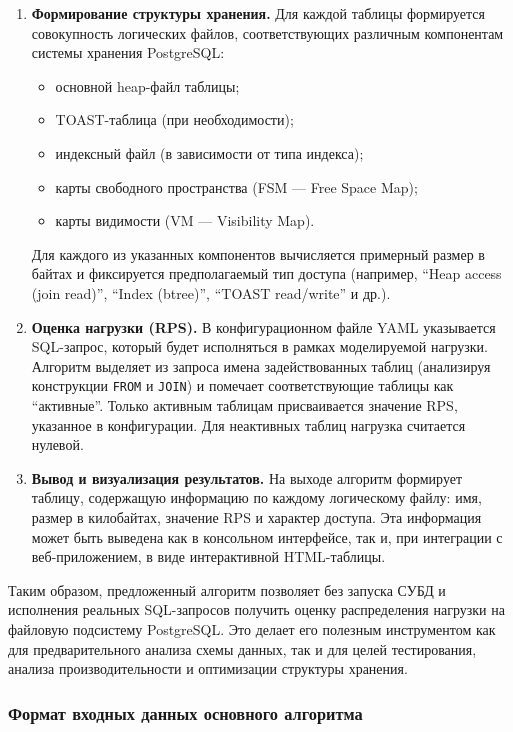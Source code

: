 \begin{enumerate}
    \item \textbf{Формирование структуры хранения.}
    Для каждой таблицы формируется совокупность логических файлов, соответствующих различным компонентам системы хранения PostgreSQL:
    \begin{itemize}
        \item основной heap-файл таблицы;
        \item TOAST-таблица (при необходимости);
        \item индексный файл (в зависимости от типа индекса);
        \item карты свободного пространства (FSM --- Free Space Map);
        \item карты видимости (VM --- Visibility Map).
    \end{itemize}
    Для каждого из указанных компонентов вычисляется примерный размер в байтах и фиксируется предполагаемый тип доступа (например, ``Heap access (join read)'', ``Index (btree)'', ``TOAST read/write'' и др.).

    \item \textbf{Оценка нагрузки (RPS).}
    В конфигурационном файле YAML указывается SQL-запрос, который будет исполняться в рамках моделируемой нагрузки. Алгоритм выделяет из запроса имена задействованных таблиц (анализируя конструкции \texttt{FROM} и \texttt{JOIN}) и помечает соответствующие таблицы как ``активные''. Только активным таблицам присваивается значение RPS, указанное в конфигурации. Для неактивных таблиц нагрузка считается нулевой.

    \item \textbf{Вывод и визуализация результатов.}
    На выходе алгоритм формирует таблицу, содержащую информацию по каждому логическому файлу: имя, размер в килобайтах, значение RPS и характер доступа. Эта информация может быть выведена как в консольном интерфейсе, так и, при интеграции с веб-приложением, в виде интерактивной HTML-таблицы.
\end{enumerate}

\vspace{0.5em}
\noindent
Таким образом, предложенный алгоритм позволяет без запуска СУБД и исполнения реальных SQL-запросов получить оценку распределения нагрузки на файловую подсистему PostgreSQL. Это делает его полезным инструментом как для предварительного анализа схемы данных, так и для целей тестирования, анализа производительности и оптимизации структуры хранения.



\subsubsection{Формат входных данных основного алгоритма}

